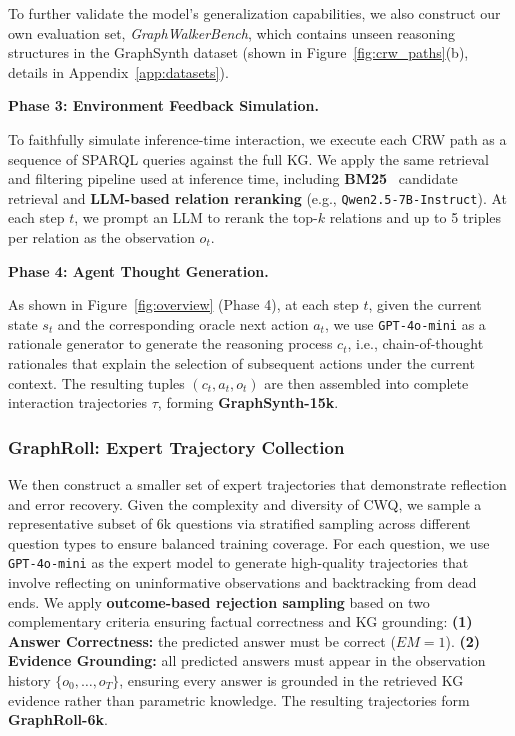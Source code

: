 To further validate the model's generalization capabilities, we also construct our own evaluation set, \textit{GraphWalkerBench},  which contains unseen reasoning structures in the GraphSynth dataset (shown in Figure~\ref{fig:crw_paths}(b), details in Appendix~\ref{app:datasets}).



\textbf{Phase 3: Environment Feedback Simulation.}

To faithfully simulate inference-time interaction, we execute each CRW path as a sequence of SPARQL queries against the full KG. We apply the same retrieval and filtering pipeline used at inference time, including \textbf{BM25}~\citep{bm25} candidate retrieval and \textbf{LLM-based relation reranking} (e.g., \texttt{Qwen2.5-7B-Instruct}). 
At each step $t$, we prompt an LLM to rerank the top-$k$ relations and up to 5 triples per relation as the observation $o_t$.

\textbf{Phase 4: Agent Thought Generation.}

As shown in Figure~\ref{fig:overview} (Phase 4), at each step $t$, given the current state $s_t$ and the corresponding oracle next action $a_{t}$, we use \texttt{GPT-4o-mini} as a rationale generator to generate the reasoning process $c_t$, i.e., chain-of-thought rationales that explain the selection of subsequent actions under the current context.
The resulting tuples $(c_t, a_t, o_t)$ are then assembled into complete interaction trajectories $\tau$, forming \textbf{GraphSynth-15k}.


\subsubsection{GraphRoll: Expert Trajectory Collection}
We then construct a smaller set of expert trajectories that demonstrate reflection and error recovery.
Given the complexity and diversity of CWQ, we sample a representative subset of 6k questions via stratified sampling across different question types to ensure balanced training coverage.
For each question, we use \texttt{GPT-4o-mini} as the expert model 
to generate high-quality trajectories that involve reflecting on 
uninformative observations and backtracking from dead ends.
We apply \textbf{outcome-based rejection sampling} based on two 
complementary criteria ensuring factual correctness and KG grounding:
\textbf{(1) Answer Correctness:} the predicted answer must be correct ($EM=1$).
\textbf{(2) Evidence Grounding:} all predicted answers must appear in the 
observation history $\{o_0, \ldots, o_T\}$, ensuring every answer is 
grounded in the retrieved KG evidence rather than parametric knowledge.
The resulting trajectories form \textbf{GraphRoll-6k}.



